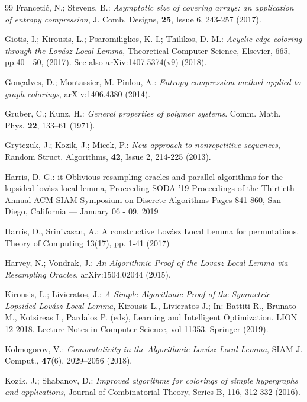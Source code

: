 \documentclass[11pt]{article}
\begin{document}
\begin{thebibliography}{99}
 Franceti\'c, N.;  Stevens, B.:
{\it Asymptotic size of covering arrays: an application of entropy compression},
J. Comb. Designs, {\bf  25}, Issue 6,
243-257 (2017).


 Giotis, I.; Kirousis, L.; Psaromiligkos, K. I.; Thilikos, D. M.: {\it  Acyclic edge coloring
through the Lovász Local Lemma}, Theoretical Computer Science, Elsevier, 665, pp.40 - 50, (2017). See also
 arXiv:1407.5374(v9) (2018).


 Gon\c{c}alves, D.;  Montassier, M. Pinlou, A.: {\it Entropy compression method applied to graph colorings}, arXiv:1406.4380 (2014).

Gruber, C.; Kunz, H.: {\it General properties of polymer systems}.
{Comm. Math. Phys.} {\bf 22}, 133--61 (1971).



 Grytczuk, J.; Kozik, J.; Micek, P.: {\it New approach to nonrepetitive sequences},
Random Struct. Algorithms, {\bf 42}, Issue 2, 214-225 (2013).


 Harris, D. G.: {it Oblivious resampling oracles and parallel algorithms for the lopsided lovász local lemma},
Proceeding
SODA '19 Proceedings of the Thirtieth Annual ACM-SIAM Symposium on Discrete Algorithms
Pages 841-860, San Diego, California — January 06 - 09, 2019

 Harris, D., Srinivasan, A.: A constructive Lov\'asz Local Lemma for permutations. Theory of
Computing 13(17), pp. 1-41 (2017)

 Harvey, N.; Vondrak, J.: {\it An Algorithmic Proof of the Lovasz Local Lemma via Resampling Oracles}, arXiv:1504.02044 (2015).

 Kirousis, L.; Livieratos, J.: {\it A Simple Algorithmic Proof of the
Symmetric Lopsided Lov\'asz Local Lemma}, Kirousis L., Livieratos J.; In: Battiti R., Brunato M., Kotsireas I., Pardalos P. (eds), Learning and Intelligent Optimization. LION 12 2018. Lecture Notes in Computer Science, vol 11353. Springer (2019).

  Kolmogorov, V.: {\it Commutativity in the Algorithmic Lovász Local Lemma}, SIAM J. Comput., {\bf 47}(6), 2029–2056 (2018).

 Kozik, J.; Shabanov, D.: {\it Improved algorithms for colorings of simple hypergraphs and applications},
Journal of Combinatorial Theory, Series B, {116},  312-332 (2016).




\end{thebibliography}
\end{document}
